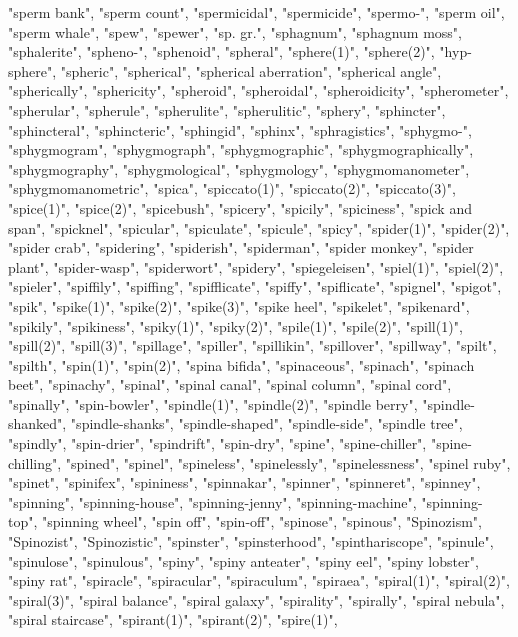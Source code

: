 "sperm bank",
"sperm count",
"spermicidal",
"spermicide",
"spermo-",
"sperm oil",
"sperm whale",
"spew",
"spewer",
"sp. gr.",
"sphagnum",
"sphagnum moss",
"sphalerite",
"spheno-",
"sphenoid",
"spheral",
"sphere(1)",
"sphere(2)",
"hyp-sphere",
"spheric",
"spherical",
"spherical aberration",
"spherical angle",
"spherically",
"sphericity",
"spheroid",
"spheroidal",
"spheroidicity",
"spherometer",
"spherular",
"spherule",
"spherulite",
"spherulitic",
"sphery",
"sphincter",
"sphincteral",
"sphincteric",
"sphingid",
"sphinx",
"sphragistics",
"sphygmo-",
"sphygmogram",
"sphygmograph",
"sphygmographic",
"sphygmographically",
"sphygmography",
"sphygmological",
"sphygmology",
"sphygmomanometer",
"sphygmomanometric",
"spica",
"spiccato(1)",
"spiccato(2)",
"spiccato(3)",
"spice(1)",
"spice(2)",
"spicebush",
"spicery",
"spicily",
"spiciness",
"spick and span",
"spicknel",
"spicular",
"spiculate",
"spicule",
"spicy",
"spider(1)",
"spider(2)",
"spider crab",
"spidering",
"spiderish",
"spiderman",
"spider monkey",
"spider plant",
"spider-wasp",
"spiderwort",
"spidery",
"spiegeleisen",
"spiel(1)",
"spiel(2)",
"spieler",
"spiffily",
"spiffing",
"spifflicate",
"spiffy",
"spiflicate",
"spignel",
"spigot",
"spik",
"spike(1)",
"spike(2)",
"spike(3)",
"spike heel",
"spikelet",
"spikenard",
"spikily",
"spikiness",
"spiky(1)",
"spiky(2)",
"spile(1)",
"spile(2)",
"spill(1)",
"spill(2)",
"spill(3)",
"spillage",
"spiller",
"spillikin",
"spillover",
"spillway",
"spilt",
"spilth",
"spin(1)",
"spin(2)",
"spina bifida",
"spinaceous",
"spinach",
"spinach beet",
"spinachy",
"spinal",
"spinal canal",
"spinal column",
"spinal cord",
"spinally",
"spin-bowler",
"spindle(1)",
"spindle(2)",
"spindle berry",
"spindle-shanked",
"spindle-shanks",
"spindle-shaped",
"spindle-side",
"spindle tree",
"spindly",
"spin-drier",
"spindrift",
"spin-dry",
"spine",
"spine-chiller",
"spine-chilling",
"spined",
"spinel",
"spineless",
"spinelessly",
"spinelessness",
"spinel ruby",
"spinet",
"spinifex",
"spininess",
"spinnakar",
"spinner",
"spinneret",
"spinney",
"spinning",
"spinning-house",
"spinning-jenny",
"spinning-machine",
"spinning-top",
"spinning wheel",
"spin off",
"spin-off",
"spinose",
"spinous",
"Spinozism",
"Spinozist",
"Spinozistic",
"spinster",
"spinsterhood",
"spinthariscope",
"spinule",
"spinulose",
"spinulous",
"spiny",
"spiny anteater",
"spiny eel",
"spiny lobster",
"spiny rat",
"spiracle",
"spiracular",
"spiraculum",
"spiraea",
"spiral(1)",
"spiral(2)",
"spiral(3)",
"spiral balance",
"spiral galaxy",
"spirality",
"spirally",
"spiral nebula",
"spiral staircase",
"spirant(1)",
"spirant(2)",
"spire(1)",
